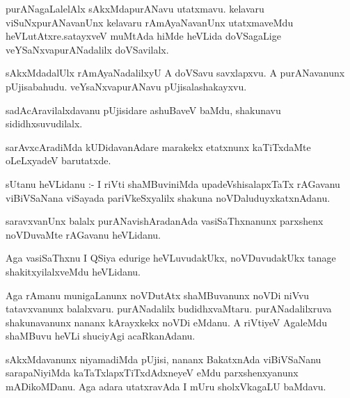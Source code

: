 \documentclass{article}
\begin{document}
\begin{mn}
purANagaLalelAlx  sAkxMdapurANavu  utatxmavu.  kelavaru  viSuNxpurANavanUnx  kelavaru  rAmAyaNavanUnx  utatxmaveMdu  
heVLutAtxre.satayxveV  muMtAda  hiMde  heVLida  doVSagaLige  veYSaNxvapurANadalilx  doVSavilalx.
\end{mn}

\begin{mn}
sAkxMdadalUlx  rAmAyaNadalilxyU  A  doVSavu  savxlapxvu.  A  purANavanunx  pUjisabahudu.  veYsaNxvapurANavu  pUjisalashakayxvu.
\end{mn}

\begin{mn}
sadAcAravilalxdavanu  pUjisidare  ashuBaveV  baMdu,  shakunavu  sididhxsuvudilalx.
\end{mn}

\begin{mn}
sarAvxcAradiMda  kUDidavanAdare  marakekx  etatxnunx  kaTiTxdaMte  oLeLxyadeV  barutatxde.
\end{mn}

\begin{mn}
sUtanu  heVLidanu :- I  riVti  shaMBuviniMda  upadeVshisalapxTaTx  rAGavanu  viBiVSaNana  viSayada  pariVkeSxyalilx  
shakuna  noVDaluduyxkatxnAdanu.
\end{mn}

\begin{mn}
saravxvanUnx  balalx  purANavishAradanAda  vasiSaThxnanunx  parxshenx  noVDuvaMte  rAGavanu  heVLidanu.
\end{mn}

\begin{mn}
Aga  vasiSaThxnu  I  QSiya  edurige  heVLuvudakUkx,  noVDuvudakUkx  tanage  shakitxyilalxveMdu heVLidanu.
\end{mn}

\begin{mn}
Aga  rAmanu  munigaLanunx  noVDutAtx  shaMBuvanunx  noVDi  niVvu  tatavxvanunx  balalxvaru.  purANadalilx  
budidhxvaMtaru.  purANadalilxruva  shakunavanunx  nananx  kArayxkekx  noVDi  eMdanu.  A  riVtiyeV  AgaleMdu  
shaMBuvu  heVLi  shuciyAgi  acaRkanAdanu.
\end{mn}

\begin{mn}
sAkxMdavanunx  niyamadiMda  pUjisi,  nananx  BakatxnAda  viBiVSaNanu  sarapaNiyiMda  kaTaTxlapxTiTxdAdxneyeV  
eMdu  parxshenxyanunx  mADikoMDanu.  Aga  adara  utatxravAda  I  mUru  sholxVkagaLU  baMdavu.
\end{mn}
\end{document}
